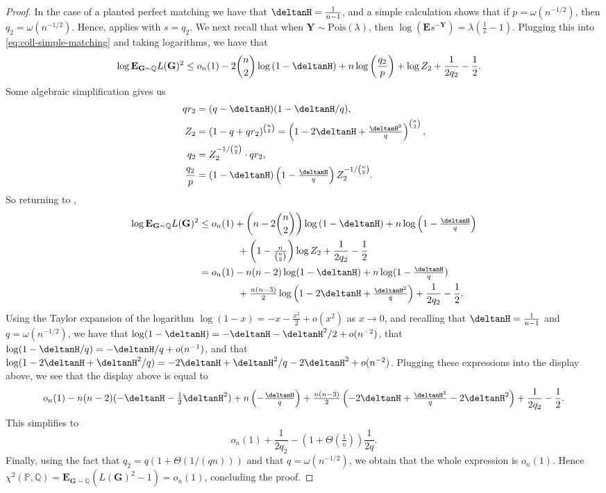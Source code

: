 \documentclass[11pt]{article}
\newcommand{\e}{{\mathbf E}}
\newcommand{\bG}{\mathbf{G}}
\newcommand{\bY}{\mathbf{Y}}
\newcommand{\bbP}{\mathbb{P}}
\newcommand{\bbQ}{\mathbb{Q}}
\numberwithin{equation}{section}
\numberwithin{thm}{section}
\begin{document}
\begin{proof}
In the case of a planted perfect matching we have that $\deltanH = \frac{1}{n-1}$, 
and a simple calculation shows that 
if $p = \omega(n^{-1/2})$, 
then $q_2 = \omega(n^{-1/2})$.  
Hence,  applies with $s = q_{2}$.
We next recall that when $\bY \sim \mathrm{Pois}(\lambda)$, then $\log(\e{s^{-\bY}}) = \lambda\left(\frac{1}{s} - 1\right)$.
Plugging this into \cref{eq:coll-simple-matching} and taking logarithms, we have that 
\begin{align}
    \log \e_{\bG \sim \bbQ} L(\bG)^2
    &\le o_n(1) - 2\binom{n}{2}\log\left(1-\deltanH\right)  + n\log\left(\frac{q_2}{p}\right)+ \log Z_2 + \frac{1}{2q_2} - \frac{1}{2}. \label{eq:log}
    \end{align}
    Some algebraic simplification gives us
\begin{align}
    q r_2 &= (q-\deltanH)(1-\deltanH/q),\label{eq:simplif}\\
    Z_2 &= (1-q+qr_2)^{\binom{n}{2}} = \left(1-2\deltanH + \tfrac{\deltanH^2}{q}\right)^{\binom{n}{2}},\nonumber\\
    q_2 &= Z_2^{-1/\binom{n}{2}} \cdot q r_2, \nonumber\\
    \frac{q_2}{p} &= (1-\deltanH)\left(1-\tfrac{\deltanH}{q}\right) Z_2^{-1/\binom{n}{2}}.\nonumber
\end{align}
So returning to , 
\begin{align*}
\log \e_{\bG\sim\bbQ} L(\bG)^2
&\le o_n(1) + \left(n - 2\binom{n}{2}\right) \log \left(1-\deltanH\right) + n \log\left(1-\tfrac{\deltanH}{q}\right)  \\
&\qquad \qquad + \left(1-\tfrac{n}{\binom{n}{2}}\right)\log Z_2 + \frac{1}{2 q_2} - \frac{1}{2}\\
&= o_n(1) - n(n-2)\log (1-\deltanH) + n \log(1-\tfrac{\deltanH}{q})  \\
&\qquad \qquad + \tfrac{n(n-3)}{2} \log \left(1 - 2\deltanH + \tfrac{\deltanH^2}{q}\right) + \frac{1}{2q_2} - \frac{1}{2}.
\end{align*}
Using the Taylor expansion of the logarithm $\log(1-x) = -x - \frac{x^{2}}{2} + o(x^{2})$ as $x \to 0$, 
and recalling that $\deltanH = \frac{1}{n-1}$ and $q = \omega(n^{-1/2})$, 
we have that 
$\log(1 - \deltanH) = - \deltanH - \deltanH^{2} / 2 + o( n^{-2})$, 
that 
$\log(1 - \deltanH / q) = - \deltanH / q + o(n^{-1})$, 
and that 
$\log(1 - 2\deltanH + \deltanH^{2} / q) 
= - 2 \deltanH + \deltanH^{2} / q - 2 \deltanH^{2} + o(n^{-2})$. 
Plugging these expressions into the display above, we see that the display above is equal to 
\[
o_n(1) 
- n(n-2)(-\deltanH - \tfrac{1}{2}\deltanH^2)
+ n \left(-\tfrac{\deltanH}{q}\right)
+ \tfrac{n(n-3)}{2}\left( -2\deltanH + \tfrac{\deltanH^2}{q} - 2\deltanH^2\right)
 + \frac{1}{2q_{2}} - \frac{1}{2}.
\]
This simplifies to 
\[
o_{n}(1) + \frac{1}{2q_{2}} - \left(1 + \Theta \left( \tfrac{1}{n} \right) \right) \frac{1}{2q}.
\]
Finally, using the fact that $q_{2} = q \left( 1 + \Theta\left( 1/(qn) \right) \right)$ 
and that $q = \omega(n^{-1/2})$, 
we obtain that the whole expression is $o_{n}(1)$. 
Hence $\chi^2(\bbP, \bbQ) = \e_{\bG \sim \bbQ} ( L(\bG)^2 - 1 ) = o_n(1)$, concluding the proof.
\end{proof}
\end{document}
